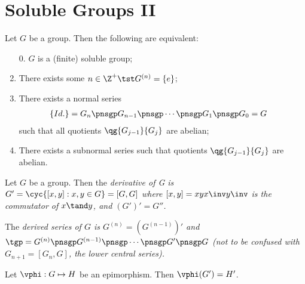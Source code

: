 \documentclass[a4paper]{article}
\begin{document}
\section{Soluble Groups II}
\begin{ttheorem}
  Let \( G \) be a group.
  Then the following are equivalent:
  \begin{enumerate}
    \item[0.] \( G \) is a (finite) soluble group;
    \item There exists some \( n\in \Z^{+} \tst G^{(n)} = \left\{ e \right\} \);
    \item There exists a normal series \begin{align*}
      \left\{ Id. \right\} &= G_n \pnsgp G_{n-1} \pnsgp \cdots \pnsgp G_1 \pnsgp G_0 = G
    \end{align*}
    such that all quotients \( \qg{G_{j-1}}{G_j} \) are abelian;
    \item There exists a subnormal series such that quotients \( \qg{G_{j-1}}{G_j} \) are abelian.
  \end{enumerate}
\end{ttheorem}

\begin{tdefinition}
  Let \( G \) be a group.
  Then the \it{derivative of G} is \( G' = \cyc{[x,y] : x,y\in G} = [G,G] \) where \( [x,y] = xyx\inv y\inv \) is the \it{commutator} of \( x\tand y \), and \( (G')' = G'' \).
\end{tdefinition}



\begin{tdefinition}
  The \it{derived series} of \( G \) is \( G^{(n)} = \left( G^{(n-1)} \right)' \) and \( \tgp = G^{(n)} \pnsgp G^{(n-1)} \pnsgp \cdots \pnsgp G' \pnsgp G \) (not to be confused with \( G_{n+1} = [G_n, G]\), the \it{lower central series}).
\end{tdefinition}

\begin{tlemma}
  Let \( \vphi:G\mapsto H \) be an epimorphism.
  Then \( \vphi(G') = H' \).
\end{tlemma}
\end{document}
